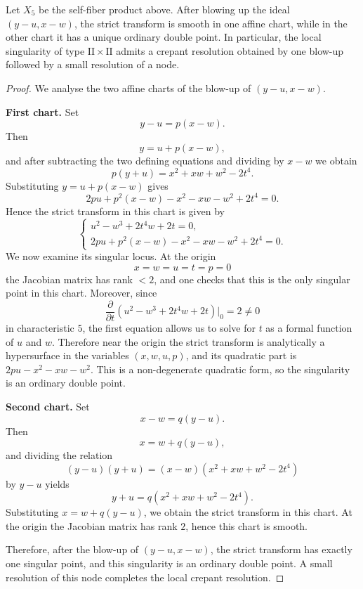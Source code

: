 \documentclass[10pt,a4paper]{amsart}
\begin{document}
\begin{Lem}
Let $X_5$ be the self-fiber product above. After blowing up the ideal $(y-u,x-w)$, the strict transform is smooth in one affine chart, while in the other chart it has a unique ordinary double point. In particular, the local singularity of type $\mathrm{II}\times \mathrm{II}$ admits a crepant resolution obtained by one blow-up followed by a small resolution of a node.
\end{Lem}

\begin{proof}
We analyse the two affine charts of the blow-up of $(y-u,x-w)$.

\smallskip
\noindent
\textbf{First chart.}
Set
\[
y-u=p(x-w).
\]
Then
\[
y=u+p(x-w),
\]
and after subtracting the two defining equations and dividing by $x-w$ we obtain
\[
p(y+u)=x^2+xw+w^2-2t^4.
\]
Substituting $y=u+p(x-w)$ gives
\[
2pu+p^2(x-w)-x^2-xw-w^2+2t^4=0.
\]
Hence the strict transform in this chart is given by
\[
\begin{cases}
u^2-w^3+2t^4w+2t=0,\\
2pu+p^2(x-w)-x^2-xw-w^2+2t^4=0.
\end{cases}
\]
We now examine its singular locus. At the origin
\[
x=w=u=t=p=0
\]
the Jacobian matrix has rank $<2$, and one checks that this is the only singular point in this chart. Moreover, since
\[
\frac{\partial}{\partial t}(u^2-w^3+2t^4w+2t)\bigg|_{0}=2\neq 0
\]
in characteristic $5$, the first equation allows us to solve for $t$ as a formal function of $u$ and $w$. Therefore near the origin the strict transform is analytically a hypersurface in the variables $(x,w,u,p)$, and its quadratic part is
$
2pu-x^2-xw-w^2.
$
This is a non-degenerate quadratic form, so the singularity is an ordinary double point.

\smallskip
\noindent
\textbf{Second chart.}
Set
\[
x-w=q(y-u).
\]
Then
\[
x=w+q(y-u),
\]
and dividing the relation
\[
(y-u)(y+u)=(x-w)(x^2+xw+w^2-2t^4)
\]
by $y-u$ yields
\[
y+u=q(x^2+xw+w^2-2t^4).
\]
Substituting $x=w+q(y-u)$, we obtain the strict transform in this chart. At the origin the Jacobian matrix has rank $2$, hence this chart is smooth.

Therefore, after the blow-up of $(y-u,x-w)$, the strict transform has exactly one singular point, and this singularity is an ordinary double point. A small resolution of this node completes the local crepant resolution.
\end{proof}
\end{document}
